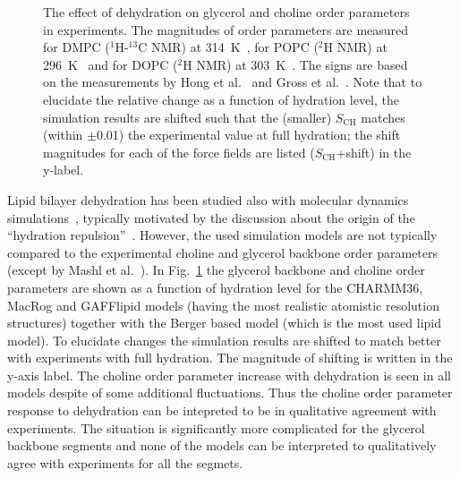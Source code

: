 \documentclass[journal=jacsat,manuscript=article]{achemso}
\begin{document}
\begin{figure}[]
    \caption{\label{ordPhydr}
    The effect of dehydration on glycerol and choline order parameters in experiments.
    The magnitudes of order parameters are measured for DMPC ($^1$H-$^{13}$C NMR) at 314~K~\cite{dvinskikh05b}, 
    for POPC ($^2$H NMR) at 296~K~\cite{bechinger91} and for DOPC ($^2$H NMR) at 303~K~\cite{ulrich94}. 
    The signs are based on the measurements by Hong et al.~\cite{hong95a,hong95b} 
    and Gross et al.~\cite{gross97}.
    Note that to elucidate the relative change as a function of hydration level,
    the simulation results are shifted such that the (smaller) $S_\mathrm{CH}$
    matches (within $\pm$0.01) the experimental value at full hydration;
    the shift magnitudes for each of the force fields are listed ($S_\mathrm{CH}$+shift) in the y-label.
  }
\end{figure}

Lipid bilayer dehydration has been studied also with molecular dynamics simulations~\cite{mashl01,pertsin05,pertsin07,eun09,eun10,schneck12},
typically motivated by the  discussion about the origin of the ``hydration repulsion''~\cite{israelachvili,israelachvili96,sparr11}.
However, the used simulation models are not typically compared to the experimental choline and glycerol backbone
order parameters (except by Mashl et al.~\cite{mashl01}).
In Fig.~\ref{ordPhydr} the glycerol backbone and choline order parameters are shown as a function of hydration level for the CHARMM36, 
MacRog and GAFFlipid models (having the most realistic atomistic resolution structures) together with the Berger based model 
(which is the most used lipid model). 
To elucidate changes the simulation results are shifted to match better with experiments with full hydration.
The magnitude of shifting is written in the y-axis label.
The choline order parameter increase with dehydration is seen in all
models despite of some additional fluctuations. Thus the choline order parameter response to dehydration can be
intepreted to be in qualitative agreement with experiments.
The situation is significantly more complicated for the glycerol backbone segments 
and none of the models can be interpreted to qualitatively agree with experiments
for all the segmets.
\end{document}
